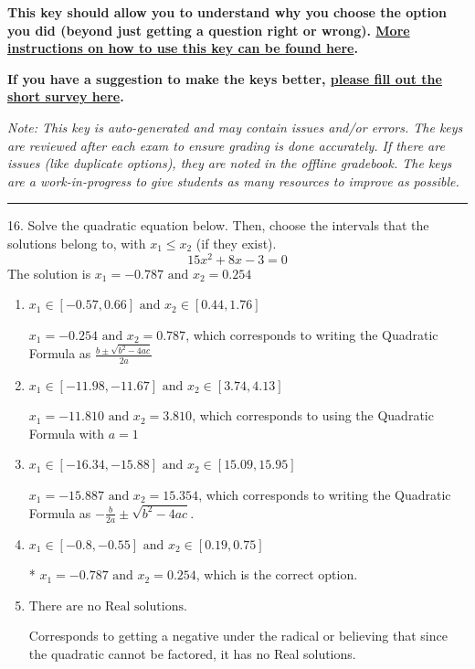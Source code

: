 \documentclass{article}[14pt]
\begin{document}
\textbf{This key should allow you to understand why you choose the option you did (beyond just getting a question right or wrong). \href{https://xronos.clas.ufl.edu/mac1105spring2020/courseDescriptionAndMisc/Exams/LearningFromResults}{More instructions on how to use this key can be found here}.}

\textbf{If you have a suggestion to make the keys better, \href{https://forms.gle/CZkbZmPbC9XALEE88}{please fill out the short survey here}.}

\textit{Note: This key is auto-generated and may contain issues and/or errors. The keys are reviewed after each exam to ensure grading is done accurately. If there are issues (like duplicate options), they are noted in the offline gradebook. The keys are a work-in-progress to give students as many resources to improve as possible.}

\rule{\textwidth}{0.4pt}

16. Solve the quadratic equation below. Then, choose the intervals that the solutions belong to, with $x_1 \leq x_2$ (if they exist).
$$ 15x^{2} +8 x -3 = 0 $$ 
The solution is $ x_1 = -0.787 \text{ and } x_2 = 0.254 $ 

\begin{enumerate}[label=\Alph*.] 
\item $ x_1 \in [-0.57, 0.66] \text{ and } x_2 \in [0.44, 1.76] $ 

  $x_1 = -0.254 \text{ and } x_2 = 0.787$, which corresponds to writing the Quadratic Formula as $\frac{b \pm \sqrt{b^2 - 4ac}}{2a}$ 
\item $ x_1 \in [-11.98, -11.67] \text{ and } x_2 \in [3.74, 4.13] $ 

  $x_1 = -11.810 \text{ and } x_2 = 3.810$, which corresponds to using the Quadratic Formula with $a=1$ 
\item $ x_1 \in [-16.34, -15.88] \text{ and } x_2 \in [15.09, 15.95] $ 

  $x_1 = -15.887 \text{ and } x_2 = 15.354$, which corresponds to writing the Quadratic Formula as $-\frac{b}{2a} \pm \sqrt{b^2 - 4ac}$. 
\item $ x_1 \in [-0.8, -0.55] \text{ and } x_2 \in [0.19, 0.75] $ 

 * $x_1 = -0.787 \text{ and } x_2 = 0.254$, which is the correct option. 
\item $ \text{There are no Real solutions.} $ 

 Corresponds to getting a negative under the radical or believing that since the quadratic cannot be factored, it has no Real solutions. 
\end{enumerate} 
 
\end{document}
